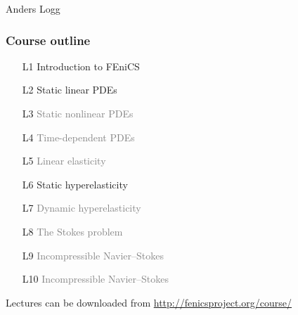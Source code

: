 \documentclass{fenicscourse}
\begin{document}
              {Anders Logg}

\begin{frame}
  \frametitle{Course outline}

  \begin{enumerate}
  \item[L1]
    Introduction to FEniCS
  \item[L2]
    Static linear PDEs
  \item[L3]
    \textcolor{grey}{Static nonlinear PDEs}
  \item[L4]
    \textcolor{grey}{Time-dependent PDEs}
  \item[L5]
    \textcolor{grey}{Linear elasticity}
  \item[L6]
    Static hyperelasticity
  \item[L7]
    \textcolor{grey}{Dynamic hyperelasticity}
  \item[L8]
    \textcolor{grey}{\textcolor{grey}{The Stokes problem}}
  \item[L9]
    \textcolor{grey}{Incompressible Navier--Stokes}
  \item[L10]
    \textcolor{grey}{Incompressible Navier--Stokes}
  \end{enumerate}

  {\footnotesize Lectures can be downloaded from
    \url{http://fenicsproject.org/course/}}

\end{frame}
\end{document}
